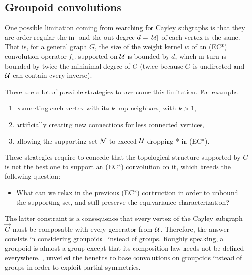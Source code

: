

\subsection{Groupoid convolutions}

One possible limitation coming from searching for Cayley subgraphs is that they are order-regular \ie the in- and the out-degree $d = |\mathcal{U}|$ of each vertex is the same. That is, for a general graph $G$, the size of the weight kernel $w$ of an (EC*) convolution operator $f_w$ supported on $\mathcal{U}$ is bounded by $d$, which in turn is bounded by twice the mininimal degree of $G$ (twice because $G$ is undirected and $\mathcal{U}$ can contain every inverse).

There are a lot of possible strategies to overcome this limitation. For example:
\begin{enumerate}
  \item connecting each vertex with its $k$-hop neighbors, with $k > 1$,
  \item artificially creating new connections for less connected vertices,
  \item allowing the supporting set $\mathcal{N}$ to exceed $\mathcal{U}$ \ie dropping * in (EC*).
\end{enumerate}

These strategies require to concede that the topological structure supported by $G$ is not the best one to support an (EC*) convolution on it, which breeds the following question:
\begin{itemize}
  \item What can we relax in the previous (EC*) contruction in order to unbound the supporting set, and still preserve the equivariance characterization?
\end{itemize}

The latter constraint is a consequence that every vertex of the Cayley subgraph $\vec{G}$ must be composable with every generator from $\mathcal{U}$. Therefore, the answer consists in considering groupoids~\citep{brandt1927verallgemeinerung} instead of groups. Roughly speaking, a groupoid is almost a group except that its composition law needs not be defined everywhere. \cite{weinstein1996groupoids}, unveiled the benefits to base convolutions on groupoids instead of groups in order to exploit partial symmetries.

